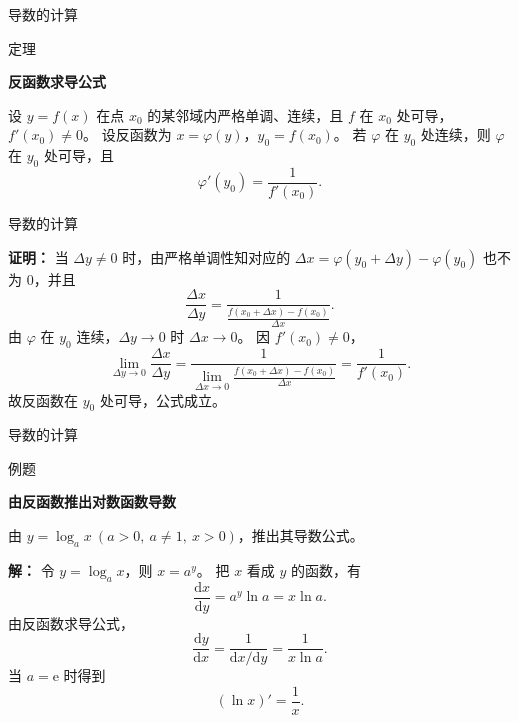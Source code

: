 \documentclass[aspectratio=169,10pt,fontset=fandol]{ctexbeamer}
\newcommand{\dd}{\mathrm{d}}
\newcommand{\ee}{\mathrm{e}}
\begin{document}
\begin{frame}[t,fragile]{导数的计算}
\footnotesize
\begin{block}{定理}
{\footnotesize
\textbf{反函数求导公式}\par

设 $y=f(x)$ 在点 $x_0$ 的某邻域内严格单调、连续，且 $f$ 在 $x_0$ 处可导，$f'(x_0)\neq0$。 设反函数为 $x=\varphi(y)$，$y_0=f(x_0)$。 若 $\varphi$ 在 $y_0$ 处连续，则 $\varphi$ 在 $y_0$ 处可导，且
\[
\varphi'(y_0)=\frac{1}{f'(x_0)}.
\]

}
\end{block}
\end{frame}
\begin{frame}[t,fragile]{导数的计算}
\footnotesize
{\footnotesize
\textbf{证明：}
当 $\Delta y\neq0$ 时，由严格单调性知对应的 $\Delta x=\varphi(y_0+\Delta y)-\varphi(y_0)$ 也不为 $0$，并且
\[
\frac{\Delta x}{\Delta y}
=\frac{1}{\frac{f(x_0+\Delta x)-f(x_0)}{\Delta x}}.
\]
由 $\varphi$ 在 $y_0$ 连续，$\Delta y\to0$ 时 $\Delta x\to0$。 因 $f'(x_0)\neq0$，
\[
\lim_{\Delta y\to0}\frac{\Delta x}{\Delta y}
=\frac{1}{\lim_{\Delta x\to0}\frac{f(x_0+\Delta x)-f(x_0)}{\Delta x}}
=\frac1{f'(x_0)}.
\]
故反函数在 $y_0$ 处可导，公式成立。

}
\end{frame}
\begin{frame}[t,fragile]{导数的计算}
\normalsize
\begin{block}{例题}
{\normalsize
\textbf{由反函数推出对数函数导数}\par

由 $y=\log_a x\ (a>0,\ a\neq1,\ x>0)$，推出其导数公式。

}
\end{block}
\pause
{\normalsize
\textbf{解：}
令 $y=\log_a x$，则 $x=a^y$。 把 $x$ 看成 $y$ 的函数，有
\[
\frac{\dd x}{\dd y}=a^y\ln a=x\ln a.
\]
由反函数求导公式，
\[
\frac{\dd y}{\dd x}
=\frac{1}{\dd x/\dd y}
=\frac{1}{x\ln a}.
\]
当 $a=\ee$ 时得到
\[
(\ln x)'=\frac1x.
\]

}
\end{frame}
\end{document}
